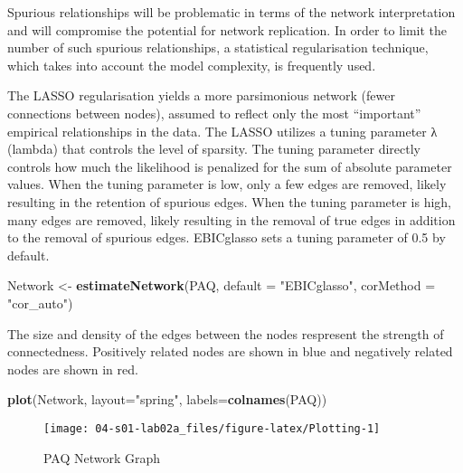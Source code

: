 \documentclass[]{book}
\newenvironment{Shaded}{\begin{snugshade}}{\end{snugshade}}
\newcommand{\DataTypeTok}[1]{\textcolor[rgb]{0.13,0.29,0.53}{#1}}
\newcommand{\KeywordTok}[1]{\textcolor[rgb]{0.13,0.29,0.53}{\textbf{#1}}}
\newcommand{\NormalTok}[1]{#1}
\newcommand{\StringTok}[1]{\textcolor[rgb]{0.31,0.60,0.02}{#1}}
\begin{document}
Spurious relationships will be problematic in terms of the network interpretation and will compromise the potential for network replication. In order to limit the number of such spurious relationships, a statistical regularisation technique, which takes into account the model complexity, is frequently used.

The LASSO regularisation yields a more parsimonious network (fewer connections between nodes), assumed to reflect only the most ``important'' empirical relationships in the data. The LASSO utilizes a tuning parameter λ (lambda) that controls the level of sparsity. The tuning parameter directly controls how much the likelihood is penalized for the sum of absolute parameter values. When the tuning parameter is low, only a few edges are removed, likely resulting in the retention of spurious edges. When the tuning parameter is high, many edges are removed, likely resulting in the removal of true edges in addition to the removal of spurious edges. EBICglasso sets a tuning parameter of 0.5 by default.

\begin{Shaded}
\begin{Highlighting}[]
\NormalTok{Network <-}\StringTok{ }\KeywordTok{estimateNetwork}\NormalTok{(PAQ, }\DataTypeTok{default =} \StringTok{"EBICglasso"}\NormalTok{, }\DataTypeTok{corMethod =} \StringTok{"cor_auto"}\NormalTok{)}
\end{Highlighting}
\end{Shaded}

The size and density of the edges between the nodes respresent the strength of connectedness. Positively related nodes are shown in { blue} and negatively related nodes are shown in {red}.

\begin{Shaded}
\begin{Highlighting}[]
\KeywordTok{plot}\NormalTok{(Network, }\DataTypeTok{layout=}\StringTok{"spring"}\NormalTok{, }\DataTypeTok{labels=}\KeywordTok{colnames}\NormalTok{(PAQ))}
\end{Highlighting}
\end{Shaded}

\begin{figure}

{\centering \texttt{[image: 04-s01-lab02a\_files/figure-latex/Plotting-1]} 

}

\caption{PAQ Network Graph}\label{fig:Plotting}
\end{figure}
\end{document}
